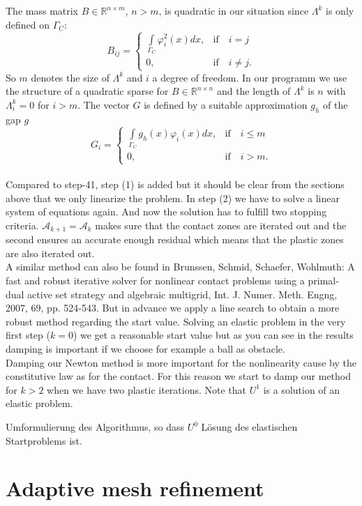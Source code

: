 \documentclass{article}
\begin{document}
\noindent
The mass matrix $B\in\mathbb{R}^{n\times m}$, $n>m$, is quadratic in our
situation since $\Lambda^k$ is only defined on $\Gamma_C$:
$$B_{ij} = \begin{cases}
\int\limits_{\Gamma_C}\varphi_i^2(x)dx, & \text{if}\quad i=j\\
0, & \text{if}\quad i\neq j.
\end{cases}$$
So $m$ denotes the size of $\Lambda^k$ and $i$ a degree of freedom. In our
programm we use the structure of a quadratic sparse for $B\in\mathbb{R}^{n\times
n}$ and the length of $\Lambda^k$ is $n$ with $\Lambda^k_i = 0$ for $i>m$.
The vector $G$ is defined by a suitable approximation $g_h$ of the gap $g$
$$G_i = \begin{cases}
\int\limits_{\Gamma_C}g_h(x)\varphi_i(x)dx, & \text{if}\quad i\leq m\\
0, & \text{if}\quad i>m.
\end{cases}$$\\
Compared to step-41, step (1) is added but it should be clear
from the sections above that we only linearize the problem. In step (2) we have
to solve a linear system of equations again. And now the solution has to fulfill two stopping
criteria. $\mathcal{A}_{k+1} = \mathcal{A}_k$ makes sure that the contact zones
are iterated out and the second ensures an accurate enough residual which means that the plastic zones are also iterated out.\\
A similar method can also be found in Brunssen, Schmid, Schaefer, Wohlmuth: A
fast and robust iterative solver for nonlinear contact problems using a 
primal-dual active set strategy and algebraic multigrid, Int. J. Numer.
Meth. Engng, 2007, 69, pp. 524-543. But in advance we apply a line search to
obtain a more robust method regarding the start value. Solving an elastic
problem in the very first step ($k=0$) we get a reasonable start value but as you
can see in the results damping is important if we choose for example a ball as
obstacle.\\
Damping our Newton method is more important for the nonlinearity cause by the
constitutive law as for the contact. For this reason we start to damp our method
for $k>2$ when we have two plastic iterations. Note that $U^1$ is a solution of
an elastic problem.

\large{Umformulierung des Algorithmus, so dass $U^0$ Lösung des elastischen
Startproblems ist.}

\section{Adaptive mesh refinement}
\end{document}
